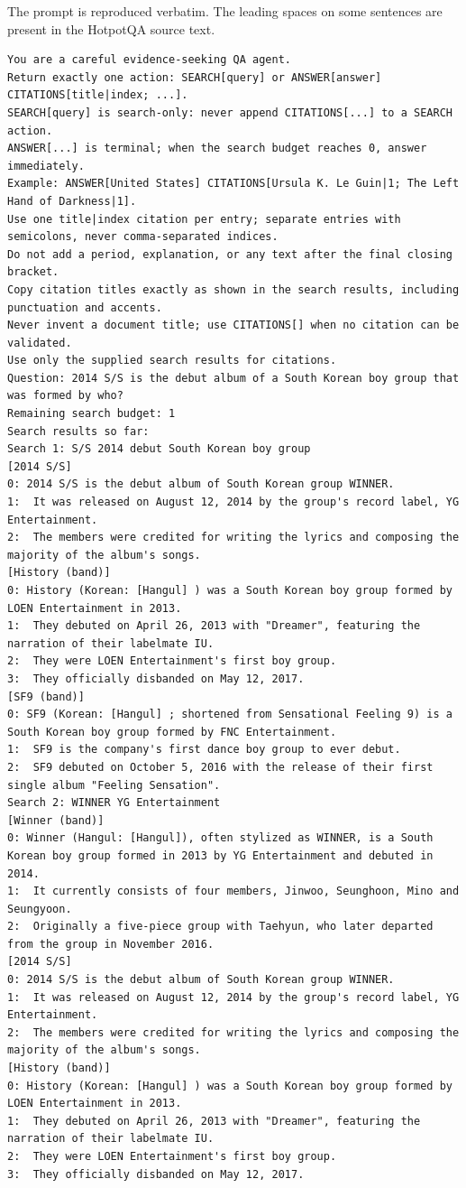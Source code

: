The prompt is reproduced verbatim. The leading spaces on some sentences
are present in the HotpotQA source text.

\begin{Verbatim}
You are a careful evidence-seeking QA agent.
Return exactly one action: SEARCH[query] or ANSWER[answer] CITATIONS[title|index; ...].
SEARCH[query] is search-only: never append CITATIONS[...] to a SEARCH action.
ANSWER[...] is terminal; when the search budget reaches 0, answer immediately.
Example: ANSWER[United States] CITATIONS[Ursula K. Le Guin|1; The Left Hand of Darkness|1].
Use one title|index citation per entry; separate entries with semicolons, never comma-separated indices.
Do not add a period, explanation, or any text after the final closing bracket.
Copy citation titles exactly as shown in the search results, including punctuation and accents.
Never invent a document title; use CITATIONS[] when no citation can be validated.
Use only the supplied search results for citations.
Question: 2014 S/S is the debut album of a South Korean boy group that was formed by who?
Remaining search budget: 1
Search results so far:
Search 1: S/S 2014 debut South Korean boy group
[2014 S/S]
0: 2014 S/S is the debut album of South Korean group WINNER.
1:  It was released on August 12, 2014 by the group's record label, YG Entertainment.
2:  The members were credited for writing the lyrics and composing the majority of the album's songs.
[History (band)]
0: History (Korean: [Hangul] ) was a South Korean boy group formed by LOEN Entertainment in 2013.
1:  They debuted on April 26, 2013 with "Dreamer", featuring the narration of their labelmate IU.
2:  They were LOEN Entertainment's first boy group.
3:  They officially disbanded on May 12, 2017.
[SF9 (band)]
0: SF9 (Korean: [Hangul] ; shortened from Sensational Feeling 9) is a South Korean boy group formed by FNC Entertainment.
1:  SF9 is the company's first dance boy group to ever debut.
2:  SF9 debuted on October 5, 2016 with the release of their first single album "Feeling Sensation".
Search 2: WINNER YG Entertainment
[Winner (band)]
0: Winner (Hangul: [Hangul]), often stylized as WINNER, is a South Korean boy group formed in 2013 by YG Entertainment and debuted in 2014.
1:  It currently consists of four members, Jinwoo, Seunghoon, Mino and Seungyoon.
2:  Originally a five-piece group with Taehyun, who later departed from the group in November 2016.
[2014 S/S]
0: 2014 S/S is the debut album of South Korean group WINNER.
1:  It was released on August 12, 2014 by the group's record label, YG Entertainment.
2:  The members were credited for writing the lyrics and composing the majority of the album's songs.
[History (band)]
0: History (Korean: [Hangul] ) was a South Korean boy group formed by LOEN Entertainment in 2013.
1:  They debuted on April 26, 2013 with "Dreamer", featuring the narration of their labelmate IU.
2:  They were LOEN Entertainment's first boy group.
3:  They officially disbanded on May 12, 2017.
\end{Verbatim}

